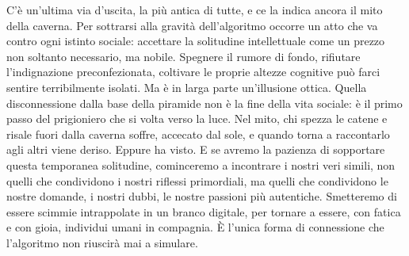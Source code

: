 C'è un'ultima via d'uscita, la più antica di tutte, e ce la indica ancora il mito della caverna. Per sottrarsi alla gravità dell'algoritmo occorre un atto che va contro ogni istinto sociale: accettare la solitudine intellettuale come un prezzo non soltanto necessario, ma nobile. Spegnere il rumore di fondo, rifiutare l'indignazione preconfezionata, coltivare le proprie altezze cognitive può farci sentire terribilmente isolati. Ma è in larga parte un'illusione ottica. Quella disconnessione dalla base della piramide non è la fine della vita sociale: è il primo passo del prigioniero che si volta verso la luce. Nel mito, chi spezza le catene e risale fuori dalla caverna soffre, accecato dal sole, e quando torna a raccontarlo agli altri viene deriso. Eppure ha visto. E se avremo la pazienza di sopportare questa temporanea solitudine, cominceremo a incontrare i nostri veri simili, non quelli che condividono i nostri riflessi primordiali, ma quelli che condividono le nostre domande, i nostri dubbi, le nostre passioni più autentiche. Smetteremo di essere scimmie intrappolate in un branco digitale, per tornare a essere, con fatica e con gioia, individui umani in compagnia. È l'unica forma di connessione che l'algoritmo non riuscirà mai a simulare.

